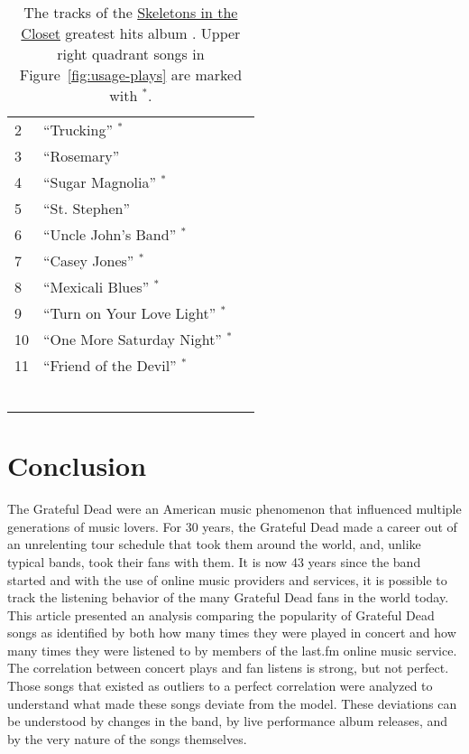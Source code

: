 \documentclass{svmult}
\newcommand{\ttt}[1]{``#1''}
\newcommand{\album}[1]{\uline{#1}}
\begin{document}
\begin{table}
\begin{minipage}{2.75in}
\begin{center}
\begin{footnotesize}
\begin{tabular}{lll}
2&\ttt{Trucking} $^*$\\
3&\ttt{Rosemary}\\
4&\ttt{Sugar Magnolia} $^*$\\ 	
5&\ttt{St. Stephen}\\
6&\ttt{Uncle John's Band} $^*$\\
7&\ttt{Casey Jones} $^*$\\
8&\ttt{Mexicali Blues} $^*$\\	
9&\ttt{Turn on Your Love Light} $^*$\\	
10&\ttt{One More Saturday Night} $^*$\\	
11&\ttt{Friend of the Devil} $^*$\\
\\ \\ \\ \\ \\ \\
\hline
\end{tabular}
\caption{\label{tab:hits2}The tracks of the \album{Skeletons in the Closet} greatest hits album \cite{skelcloset:dead1974}. Upper right quadrant songs in Figure~\ref{fig:usage-plays} are marked with $^{*}$.}
\end{footnotesize}
\end{center}
    \end{minipage}
\end{table}

\section{Conclusion}

The Grateful Dead were an American music phenomenon that influenced multiple generations of music lovers. For 30 years, the Grateful Dead made a career out of an unrelenting tour schedule that took them around the world, and, unlike typical bands, took their fans with them. It is now 43 years since the band started and with the use of online music providers and services, it is possible to track the listening behavior of the many Grateful Dead fans in the world today. This article presented an analysis comparing the popularity of Grateful Dead songs as identified by both how many times they were played in concert and how many times they were listened to by members of the last.fm online music service. The correlation between concert plays and fan listens is strong, but not perfect. Those songs that existed as outliers to a perfect correlation were analyzed to understand what made these songs deviate from the model. These deviations can be understood by changes in the band, by live performance album releases, and by the very nature of the songs themselves.
\end{document}
